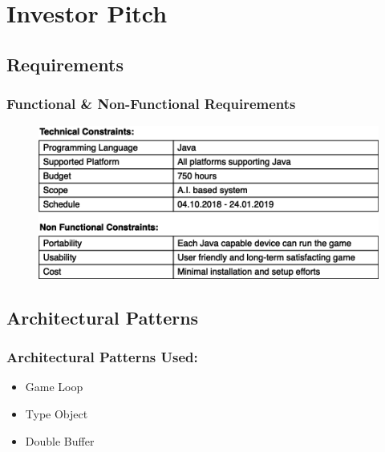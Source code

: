 \documentclass{beamer}
\begin{document}
\section{Investor Pitch}
\subsection{Requirements}
\begin{frame}
    \frametitle{Functional \& Non-Functional Requirements}
    \begin{figure}\includegraphics[scale=0.3]{resources/Software_requirements_table_bb.png} 

    \end{figure}
\end{frame}


\subsection{Architectural Patterns}
\begin{frame}
    \frametitle{Architectural Patterns Used:}
    \begin{itemize}
        \item Game Loop
        \item Type Object
        \item Double Buffer
    \end{itemize}

\end{frame}
\end{document}
